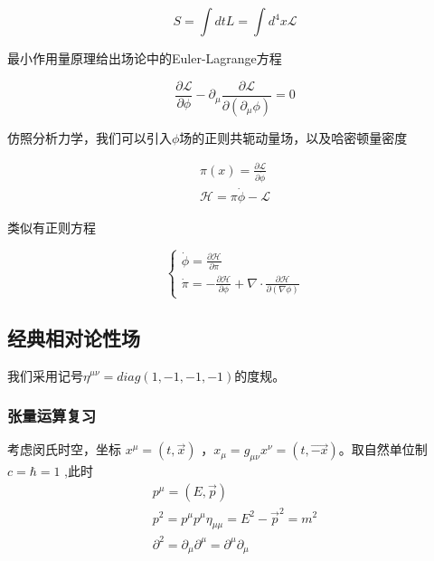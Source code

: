 \begin{equation}
    S=\int dtL=\int d^4x\mathcal{L}
\end{equation}

最小作用量原理给出场论中的Euler-Lagrange方程

\begin{equation}
    \frac{\partial\mathcal{L}}{\partial\phi}-\partial_\mu\frac{\partial\mathcal{L}}{\partial(\partial_\mu\phi)}=0
\end{equation}

仿照分析力学，我们可以引入$\phi$场的正则共轭动量场，以及哈密顿量密度

\begin{equation}
    \begin{split}
        \pi(x)=\frac{\partial\mathcal{L}}{\partial\dot{\phi}} \\
        \mathcal{H}=\pi\dot{\phi}-\mathcal{L}
    \end{split}
\end{equation}

类似有正则方程

\begin{equation}
    \left\{
        \begin{array}{lr}
            \dot{\phi}=\frac{\partial\mathcal{H}}{\partial\pi} \\
            \dot{\pi}=-\frac{\partial\mathcal{H}}{\partial\phi}+\nabla\cdot\frac{\partial\mathcal{H}}{\partial(\nabla\phi)}
        \end{array}
    \right.
\end{equation}



\subsection{经典相对论性场}

我们采用记号$\eta^{\mu\nu}=diag(1,-1,-1,-1)$的度规。

\subsubsection{张量运算复习}

考虑闵氏时空，坐标 $x^{\mu}=(t,\vec{x})$ ，$x_{\mu}=g_{\mu\nu}x^{\nu}=(t,\vec{-x})$。取自然单位制 $c=\hbar=1$ ,此时
\begin{equation}
   \begin{array}{lr}
     p^{\mu}=(E,\vec{p})\\
     p^{2}=p^{\mu}p^{\mu}\eta_{\mu\mu}=E^{2}-\vec{p}^{2}=m^{2}\\
     \partial^{2}=\partial_{\mu}\partial^{\mu}=\partial^{\mu}\partial_{\mu}
   \end{array}
\end{equation}

